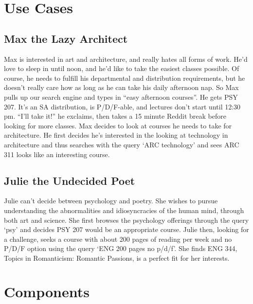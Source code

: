 \documentclass[12pt,letterpaper]{article}
\begin{document}
\section{Use Cases}
\subsection{Max the Lazy Architect}
Max is interested in art and architecture, and really hates all forms of work. He'd love to sleep in until noon, and he'd like to take the easiest classes possible. Of course, he needs to fulfill his departmental and distribution requirements, but he doesn't really care how as long as he can take his daily afternoon nap. So Max pulls up our search engine and types in ``easy afternoon courses''. He gets PSY 207. It's an SA distribution, is P/D/F-able, and lectures don't start until 12:30 pm. ``I'll take it!'' he exclaims, then takes a 15 minute Reddit break before looking for more classes. Max decides to look at courses he needs to take for architecture. He first decides he's interested in the looking at technology in architecture and thus searches with the query `ARC technology' and sees ARC 311 looks like an interesting course.
		
\subsection{Julie the Undecided Poet}
Julie can't decide between psychology and poetry. She wishes to pursue understanding the abnormalities and idiosyncracies of the human mind, through both art and science. She first browses the psychology offerings through the query `psy' and decides PSY 207 would be an appropriate course. Julie then, looking for a challenge, seeks a course with about 200 pages of reading per week and no P/D/F option using the query `ENG 200 pages no p/d/f'. She finds ENG 344, Topics in Romanticism: Romantic Passions, is a perfect fit for her interests.  

\section{Components}
\end{document}
